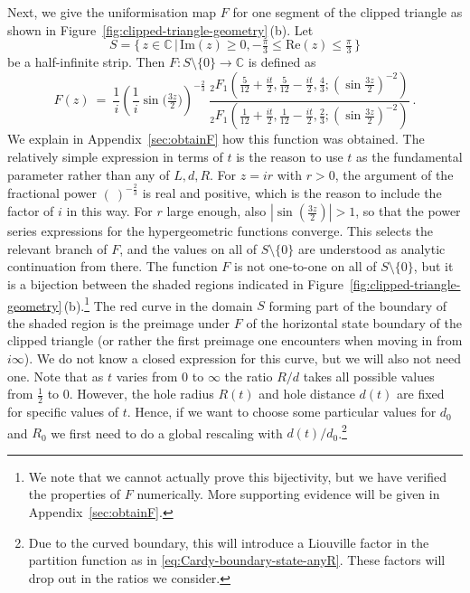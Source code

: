 \documentclass[11pt,a4paper]{article}
\numberwithin{equation}{section}
\begin{document}
\medskip
\noindent 
Next, we give the uniformisation map $F$ for one segment of the clipped triangle as shown in Figure~\ref{fig:clipped-triangle-geometry}\,(b).
Let
\begin{equation}\label{eq:S-domain-F}
    S = \big\{ \, z \in \mathbb{C} \,\big|\, \mathrm{Im}(z) \ge 0 , -\tfrac{\pi}3 \le \mathrm{Re}(z) \le \tfrac{\pi}3 \, \big\}
\end{equation}
be a half-infinite strip. Then $F : S \setminus \{0\} \to \mathbb{C}$ is defined as
\begin{equation}\label{eq:F}
    F(z) ~=~ \frac{1}{i}\left(\frac1i \sin\big(\tfrac{3z}{2}\big)\right)^{-\frac{2}{3}}
    ~
    \frac{_2F_1\left(\frac{5}{12}+\frac{it}{2},\frac{5}{12}-\frac{it}{2},\frac{4}{3};
    \left(\sin\frac{3z}{2}\right)^{-2}
    \right)}{_2F_1\left(\frac{1}{12}+\frac{it}{2},\frac{1}{12}-\frac{it}{2},\frac{2}{3};
    \left(\sin\frac{3z}{2}\right)^{-2}
    \right)} ~.
\end{equation}
We explain in Appendix~\ref{sec:obtainF} how this function was obtained. The relatively simple expression in terms of $t$ is the reason to use $t$ as the fundamental parameter rather than any of $L,d,R$.
For $z = ir$ with $r>0$, the argument of the fractional power $(~)^{-\frac23}$ is real and positive, which is the reason to include the factor of $i$ in this way. For $r$ large enough, also $|\sin\left(\frac{3z}{2}\right)|>1$, so that the power series expressions for the hypergeometric functions converge. This selects the relevant branch of $F$, and the values on all of $S \setminus \{0\}$ are understood as analytic continuation from there.
The function $F$ is not one-to-one on all of $S \setminus \{0\}$, but it is a bijection between the shaded regions indicated in Figure~\ref{fig:clipped-triangle-geometry}\,(b).\footnote{
\label{fn:we-do-not-know}
We note that we cannot actually prove this bijectivity, but we have verified the properties of $F$ numerically. More supporting evidence will be given in Appendix~\ref{sec:obtainF}.}
The red curve in the domain $S$ forming part of the boundary of the shaded region is the preimage under $F$ of the horizontal state boundary of the clipped triangle (or rather the first preimage one encounters when moving in from $i\infty$). We do not know a closed expression for this curve, but we will also not need one.    
Note that as $t$ varies from 0 to $\infty$ the ratio $R/d$ takes all possible values from $\frac12$ to $0$. However, the hole radius $R(t)$ and hole distance $d(t)$ are fixed for specific values of $t$. Hence, if we want to choose some particular values for $d_0$ and $R_0$ we first need to do a global rescaling with $d(t)/d_0$.\footnote{
Due to the curved boundary, this will
introduce a Liouville factor in the partition function as in \eqref{eq:Cardy-boundary-state-anyR}. These factors will drop out in the ratios we consider.
}
\medskip
\end{document}
